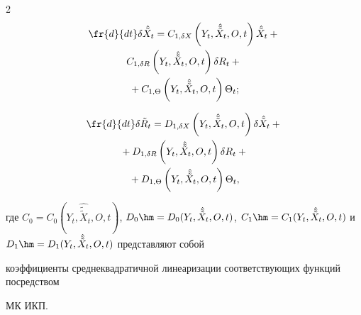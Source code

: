 \begin{multicols}{2}
\begin{multline}

\fr{d}{dt}\delta\hat{\tilde X}_t = C_{1,\delta X} \left(Y_t,  \hat{\tilde{\tilde X}}_t, O, t\right) \hat{\tilde X}_t+{}\\

  C_{1,\delta R} \left(Y_t,  \hat{\tilde{\tilde X}}_t, O, t\right)\delta R_t +{}\\

{}+C_{1,\Theta} \left(Y_t, \hat{\tilde{\tilde X}}_t, O, t\right)\Theta_t;

\label{e4.11-s2}

\end{multline}



\vspace*{-12pt}



\noindent

\begin{multline}

\fr{d}{dt}\delta \tilde R_t = D_{1,\delta X} \left(Y_t, \hat{\tilde{\tilde X}}_t, O, t\right)\delta \hat{\tilde X}_t+ {}\\

{}+

D_{1,\delta R} \left(Y_t, \hat{\tilde{\tilde  X}}_t, O, t\right)\delta R_t+{}\\

{}+ D_{1,\Theta} \left(Y_t, \hat{\tilde{\tilde X}}_t, O, t\right)\Theta_t,

    \label{e4.12-s2}

    \end{multline}

    

    \vspace*{-3pt}



\noindent

где $C_0=C_0(Y_t, \hat{\tilde{\tilde X}}_t, O, t)$, $D_0 \hm= D_0 (Y_t, 

\hat{\tilde{\tilde X}}_t, O, t)$, $C_1 \hm= C_1 (Y_t, \hat{\tilde{\tilde X}}_t, O, 

t)$ и~$D_1 \hm= D_1 (Y_t, \hat{\tilde{\tilde X}}_t, O, t)$ пред\-став\-ля\-ют собой 

коэффициенты среднеквадратичной линеаризации соответствующих функций посредством 

МК ИКП.



\smallskip




\end{multicols}
